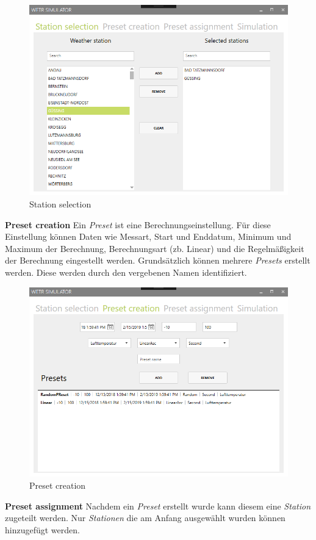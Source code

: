 \begin{figure}[H]
\centering
\includegraphics[width=.7\textwidth]{pictures/Simulator/Simulator_1_StationSelection.png}
\caption{Station selection}
\label{fig:Wetr.Simulator.Wpf.StationSelection}
\end{figure}
\raggedright

\newpage
\textbf{Preset creation}\newline
Ein \textit{Preset} ist eine Berechnungseinstellung. Für diese Einstellung können Daten wie Messart, Start und Enddatum, Minimum und Maximum der Berechnung, Berechnungsart (zb. Linear) und die Regelmäßigkeit der Berechnung eingestellt werden. 
Grundsätzlich können mehrere \textit{Presets} erstellt werden. Diese werden durch den vergebenen Namen identifiziert.

\begin{figure}[H]
\centering
\includegraphics[width=.7\textwidth]{pictures/Simulator/Simulator_2_PresetCreation.png}
\caption{Preset creation}
\label{fig:Wetr.Simulator.Wpf.PresetCreation}
\end{figure}
\raggedright

\textbf{Preset assignment}\newline
Nachdem ein \textit{Preset} erstellt wurde kann diesem eine \textit{Station} zugeteilt werden. Nur \textit{Stationen} die am Anfang ausgewählt wurden können hinzugefügt werden.

